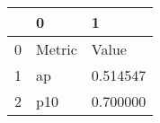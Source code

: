 \begin{tabular}{lll}
\toprule
 & 0 & 1 \\
\midrule
0 & Metric & Value \\
1 & ap & 0.514547 \\
2 & p10 & 0.700000 \\
\bottomrule
\end{tabular}

